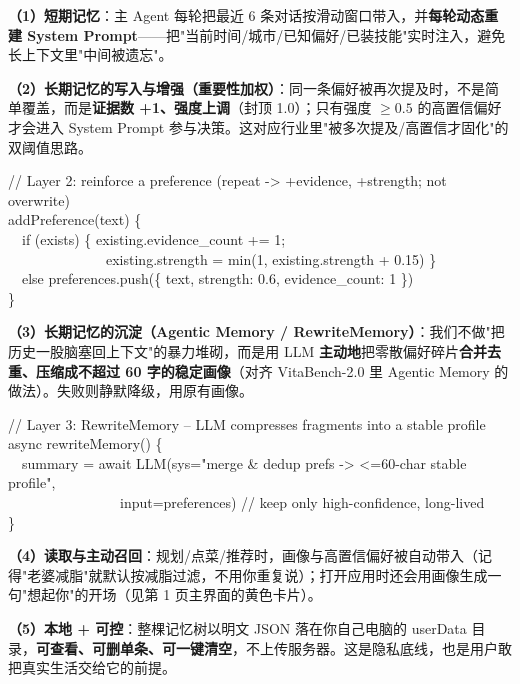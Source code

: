 \documentclass[11pt,a4paper]{ctexart}
\begin{document}
\textbf{（1）短期记忆}：主 Agent 每轮把最近 6 条对话按滑动窗口带入，并\textbf{每轮动态重建 System Prompt}——把"当前时间/城市/已知偏好/已装技能"实时注入，避免长上下文里"中间被遗忘"。

\textbf{（2）长期记忆的写入与增强（重要性加权）}：同一条偏好被再次提及时，不是简单覆盖，而是\textbf{证据数 +1、强度上调}（封顶 1.0）；只有强度 $\geq 0.5$ 的高置信偏好才会进入 System Prompt 参与决策。这对应行业里"被多次提及/高置信才固化"的双阈值思路。

\begin{tcolorbox}[colback=black!4,colframe=black!30,left=4pt,right=4pt,top=2pt,bottom=2pt,fontupper=\scriptsize\ttfamily]
// Layer 2: reinforce a preference (repeat -> +evidence, +strength; not overwrite)\\
addPreference(text) \{\\
\ \ if (exists) \{ existing.evidence\_count += 1;\\
\ \ \ \ \ \ \ \ \ \ \ \ \ \ existing.strength = min(1, existing.strength + 0.15) \}\\
\ \ else preferences.push(\{ text, strength: 0.6, evidence\_count: 1 \})\\
\}
\end{tcolorbox}

\textbf{（3）长期记忆的沉淀（Agentic Memory / RewriteMemory）}：我们不做"把历史一股脑塞回上下文"的暴力堆砌，而是用 LLM \textbf{主动地}把零散偏好碎片\textbf{合并去重、压缩成不超过 60 字的稳定画像}（对齐 VitaBench-2.0 里 Agentic Memory 的做法）。失败则静默降级，用原有画像。

\begin{tcolorbox}[colback=black!4,colframe=black!30,left=4pt,right=4pt,top=2pt,bottom=2pt,fontupper=\scriptsize\ttfamily]
// Layer 3: RewriteMemory -- LLM compresses fragments into a stable profile\\
async rewriteMemory() \{\\
\ \ summary = await LLM(sys="merge \& dedup prefs -> <=60-char stable profile",\\
\ \ \ \ \ \ \ \ \ \ \ \ \ \ \ \ input=preferences)  // keep only high-confidence, long-lived\\
\}
\end{tcolorbox}

\textbf{（4）读取与主动召回}：规划/点菜/推荐时，画像与高置信偏好被自动带入（记得"老婆减脂"就默认按减脂过滤，不用你重复说）；打开应用时还会用画像生成一句"想起你"的开场（见第 1 页主界面的黄色卡片）。

\textbf{（5）本地 + 可控}：整棵记忆树以明文 JSON 落在你自己电脑的 userData 目录，\textbf{可查看、可删单条、可一键清空}，不上传服务器。这是隐私底线，也是用户敢把真实生活交给它的前提。
\end{document}
